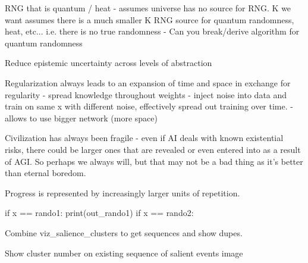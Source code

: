 \documentclass{article}
\begin{document}
RNG that is quantum / heat - assumes universe has no source for RNG.
K we want assumes there is a much smaller K RNG source for quantum randomness, heat, etc... i.e. there is no true randomness
- Can you break/derive algorithm for quantum randomness

Reduce epistemic uncertainty across levels of abstraction

Regularization always leads to an expansion of time and space in exchange for regularity
- spread knowledge throughout weights
- inject noise into data and train on same x with different noise, effectively spread out training over time.
- allows to use bigger network (more space)

Civilization has always been fragile - even if AI deals with known existential risks, there could be larger ones that are revealed or even entered into as a result of AGI. So perhaps we always will, but that may not be a bad thing as it's better than eternal boredom.

Progress is represented by increasingly larger units of repetition.

if x == rando1:
  print(out_rando1)
if x == rando2:

 Combine viz_salience_clusters to get sequences and show dupes.

 Show cluster number on existing sequence of salient events image



\end{document}
